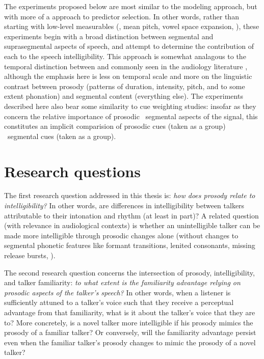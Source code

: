 The experiments proposed below are most similar to the modeling approach, but with more of a  approach to predictor selection.  In other words, rather than starting with low-level measurables (\eg, mean pitch, vowel space expansion, \etc), these experiments begin with a broad distinction between segmental and suprasegmental aspects of speech, and attempt to determine the contribution of each to the speech intelligibility.  This approach is somewhat analagous to the temporal distinction between  and  commonly seen in the audiology literature \citep[\eg][]{Rosen1992}, although the emphasis here is less on temporal scale and more on the linguistic contrast between prosody (patterns of duration, intensity, pitch, and to some extent phonation) and segmental content (everything else).  The experiments described here also bear some similarity to cue weighting studies: insofar as they concern the relative importance of prosodic \vs\ segmental aspects of the signal, this constitutes an implicit comparision of prosodic cues (taken as a group) \vs\ segmental cues (taken as a group).

\section{Research questions}
The first research question addressed in this thesis is: {\em how does prosody relate to intelligibility?}  In other words, are differences in intelligibility between talkers attributable to their intonation and rhythm (at least in part)?  A related question (with relevance in audiological contexts) is whether an unintelligible talker can be made more intelligible through prosodic changes alone (without changes to segmental phonetic features like formant transitions, lenited consonants, missing release bursts, \etc).


The second research question concerns the intersection of prosody, intelligibility, and talker familiarity: {\em to what extent is the familiarity advantage relying on prosodic aspects of the talker’s speech?}  In other words, when a  listener is sufficiently attuned to a talker’s voice such that they receive a perceptual advantage from that familiarity, what is it about the talker’s voice that they are  to?  More concretely, is a novel talker more intelligible if his prosody mimics the prosody of a familiar talker?  Or conversely, will the familiarity advantage persist even when the familiar talker’s prosody changes to mimic the prosody of a novel talker?

